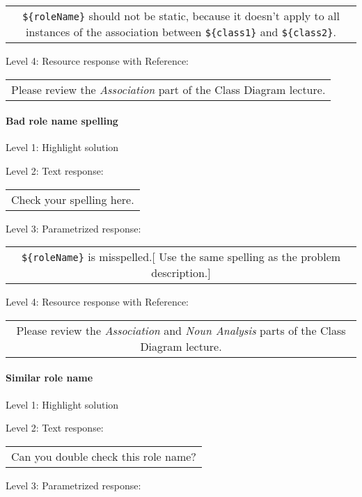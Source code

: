 \begin{tabular}{|c}
\verb|${roleName}| should not be static, because it doesn't apply to all instances of the association between \verb|${class1}| and \verb|${class2}|.
\end{tabular} \medskip

\noindent Level 4: Resource response with Reference:

\begin{tabular}{|c}
Please review the \textit{Association} part of the Class Diagram lecture.
\end{tabular} \medskip


\paragraph{Bad role name spelling}

\noindent Level 1: Highlight solution \medskip

\noindent Level 2: Text response: \medskip

\begin{tabular}{|c}
Check your spelling here.
\end{tabular} \medskip

\noindent Level 3: Parametrized response: \medskip

\begin{tabular}{|c}
\verb|${roleName}| is misspelled.[ Use the same spelling as the problem description.]
\end{tabular} \medskip

\noindent Level 4: Resource response with Reference:

\begin{tabular}{|c}
Please review the \textit{Association} and \textit{Noun Analysis} parts of the Class Diagram lecture.
\end{tabular} \medskip


\paragraph{Similar role name}

\noindent Level 1: Highlight solution \medskip

\noindent Level 2: Text response: \medskip

\begin{tabular}{|c}
Can you double check this role name?
\end{tabular} \medskip

\noindent Level 3: Parametrized response: \medskip

